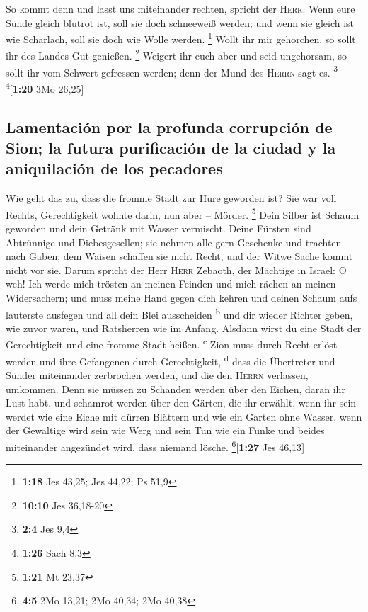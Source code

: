 So kommt denn und lasst uns miteinander rechten, spricht
der \textsc{Herr}. Wenn eure Sünde gleich blutrot ist, soll sie doch
schneeweiß werden; und wenn sie gleich ist wie Scharlach, soll sie doch
wie Wolle werden. \footnote{\textbf{1:18} Jes 43,25; Jes 44,22; Ps 51,9}
 Wollt ihr mir gehorchen, so sollt ihr des Landes Gut
genießen. \footnote{\textbf{10:10} Jes 36,18-20}  Weigert
ihr euch aber und seid ungehorsam, so sollt ihr vom Schwert gefressen
werden; denn der Mund des \textsc{Herrn} sagt es. \footnote{\textbf{2:4}
  Jes 9,4} \footnote{\textbf{1:26} Sach 8,3}{[}\textbf{1:20} 3Mo
26,25{]}

\hypertarget{lamentaciuxf3n-por-la-profunda-corrupciuxf3n-de-sion-la-futura-purificaciuxf3n-de-la-ciudad-y-la-aniquilaciuxf3n-de-los-pecadores}{%
\subsection{Lamentación por la profunda corrupción de Sion; la futura
purificación de la ciudad y la aniquilación de los
pecadores}\label{lamentaciuxf3n-por-la-profunda-corrupciuxf3n-de-sion-la-futura-purificaciuxf3n-de-la-ciudad-y-la-aniquilaciuxf3n-de-los-pecadores}}

 Wie geht das zu, dass die fromme Stadt zur Hure geworden
ist? Sie war voll Rechts, Gerechtigkeit wohnte darin, nun aber --
Mörder. \footnote{\textbf{1:21} Mt 23,37}  Dein Silber
ist Schaum geworden und dein Getränk mit Wasser vermischt.
 Deine Fürsten sind Abtrünnige und Diebesgesellen; sie
nehmen alle gern Geschenke und trachten nach Gaben; dem Waisen schaffen
sie nicht Recht, und der Witwe Sache kommt nicht vor sie.
 Darum spricht der Herr \textsc{Herr} Zebaoth, der
Mächtige in Israel: O weh! Ich werde mich trösten an meinen Feinden und
mich rächen an meinen Widersachern;  und muss meine Hand
gegen dich kehren und deinen Schaum aufs lauterste ausfegen und all dein
Blei ausscheiden \textsuperscript{b}  und dir wieder
Richter geben, wie zuvor waren, und Ratsherren wie im Anfang. Alsdann
wirst du eine Stadt der Gerechtigkeit und eine fromme Stadt heißen.
\textsuperscript{c}  Zion muss durch Recht erlöst werden
und ihre Gefangenen durch Gerechtigkeit, \textsuperscript{d}
 dass die Übertreter und Sünder miteinander zerbrochen
werden, und die den \textsc{Herrn} verlassen, umkommen. 
Denn sie müssen zu Schanden werden über den Eichen, daran ihr Lust habt,
und schamrot werden über den Gärten, die ihr erwählt, 
wenn ihr sein werdet wie eine Eiche mit dürren Blättern und wie ein
Garten ohne Wasser,  wenn der Gewaltige wird sein wie
Werg und sein Tun wie ein Funke und beides miteinander angezündet wird,
dass niemand lösche. \footnote{\textbf{4:5} 2Mo 13,21; 2Mo 40,34; 2Mo
  40,38}{[}\textbf{1:27} Jes 46,13{]}

